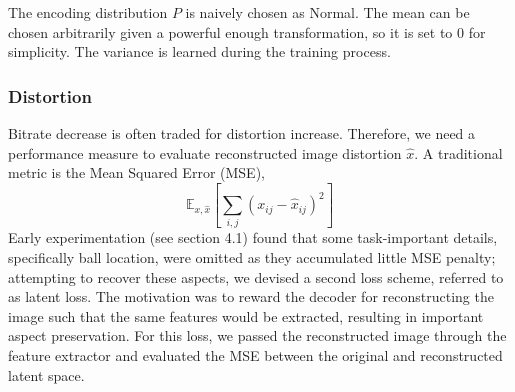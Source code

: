 
        The encoding distribution $P$ is naively chosen as Normal. The
        mean can be chosen arbitrarily given a powerful enough transformation, so it is
        set to 0 for simplicity. The variance is learned during the training process.

    \subsubsection{Distortion}\label{sub:Distortion}
        Bitrate decrease is often traded for distortion increase.
        Therefore, we need a performance measure to evaluate reconstructed image distortion $\hat{x}$. A traditional metric is the Mean Squared Error (MSE),
        \begin{equation}\label{equ:L2}
            \mathbb{E}_{x, \hat{x}}[\sum_{i,j} (x_{ij} - \hat{x}_{ij})^2]
        \end{equation}
        Early experimentation (see section 4.1) found that some task-important details, specifically ball location, were omitted as they accumulated little MSE penalty; attempting to
        recover these aspects, we devised a second loss scheme, referred to as
        latent loss. The motivation was to reward the decoder for reconstructing the
        image such that the same features would be extracted, resulting in
        important aspect preservation. For this loss, we passed the
        reconstructed image through the feature extractor and evaluated the MSE
        between the original and reconstructed latent space.






